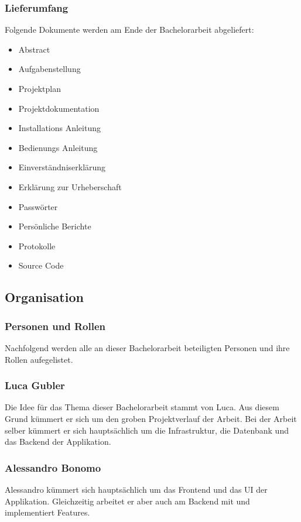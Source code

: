 \subsubsection*{Lieferumfang}
Folgende Dokumente werden am Ende der Bachelorarbeit abgeliefert:
\begin{itemize}
	\itemsep0em
	\item Abstract
	\item Aufgabenstellung
	\item Projektplan
	\item Projektdokumentation
	\item Installations Anleitung
	\item Bedienungs Anleitung
	\item Einverständniserklärung
	\item Erklärung zur Urheberschaft
	\item Passwörter
	\item Persönliche Berichte
	\item Protokolle
	\item Source Code	
\end{itemize}



\subsection{Organisation}
\subsubsection*{Personen und Rollen}
Nachfolgend werden alle an dieser Bachelorarbeit beteiligten Personen und ihre Rollen aufegelistet.
\subsubsection*{Luca Gubler}
Die Idee für das Thema dieser Bachelorarbeit stammt von Luca. Aus diesem Grund kümmert er sich um den groben Projektverlauf der Arbeit. Bei der Arbeit selber kümmert er sich hauptsächlich um die Infrastruktur, die Datenbank und das Backend der Applikation.

\subsubsection*{Alessandro Bonomo}
Alessandro kümmert sich hauptsächlich um das Frontend und das UI der Applikation. Gleichzeitig arbeitet er aber auch am Backend mit und implementiert Features.

